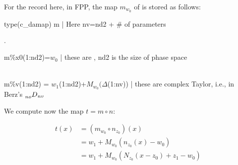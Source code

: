 \documentclass{hitec}     %
\begin{document}
{{{{For the record here, in FPP, the map ${m}_{{w}_{0}}$ of  is stored as follows:

\vskip 0.2cm
{\color{blue}
\small
\hskip 1cm type(c_damap) m    | Here nv=nd2 + \# of parameters

\hskip 4cm  .

\hskip 1cm m\%x0(1:nd2)=$w_0$ \hskip 0.5cm | these are , nd2 is the size of phase space

\vskip -1.2cm
%
\begin{align} \label{eq:cdamap} \end{align}

\hskip 1cm m\%v(1:nd2) = $w_1$(1:nd2)+$M_{w_0}(\Delta$(1:nv))   \hskip 0.5cm | these are complex Taylor, i.e., in Berz's $\prescript{}{no}{D}_{nv} $

 }
\vskip 0.2cm

We  compute now the map $t=m\circ n$:


%
%

%
\begin{align}t\left({x}\right)&=\left({{m}_{{w}_{0}}\circ {n}_{{z}_{0}}}\right)\left({x}\right)\nonumber \\
 &={w}_{1}+{M}_{{w}_{0}}({n}_{{z}_{0}}\left({x}\right)-{w}_{0})\nonumber \\
 &={w}_{1}+{M}_{{w}_{0}}({N}_{{z}_{0}}(x-{z}_{0})+{z}_{1}-{w}_{0})\ \label{eq:concattot}\end{align}

}}}}
\end{document}
